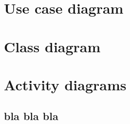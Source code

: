 \section{Use case diagram}
\begin{landscape}

\end{landscape}


\section{Class diagram}
\begin{landscape}
%
%
\end{landscape}\nopagebreak%
%
%
\section{Activity diagrams}
\subsection{bla bla bla}
\begin{figure}[H]
\centering
{}
\end{figure}


